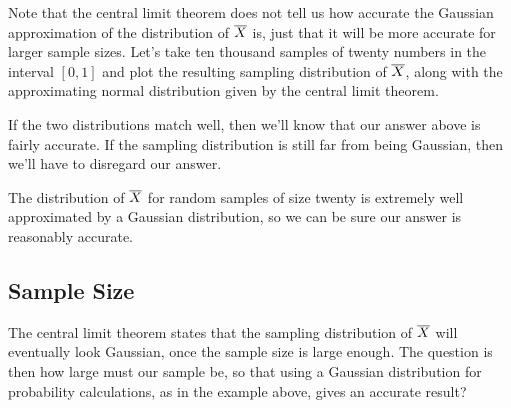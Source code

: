 \begin{example}
Note that the central limit theorem does not tell us how accurate the Gaussian approximation of the distribution of ${\overline{X}}$ is, just that it will be more accurate for larger sample sizes. Let's take ten thousand samples of twenty numbers in the interval $[0,1]$ and plot the resulting sampling distribution of ${\overline{X}}$, along with the approximating normal distribution given by the central limit theorem.

If the two distributions match well, then we'll know that our answer above is fairly accurate. If the sampling distribution is still far from being Gaussian, then we'll have to disregard our answer.
\begin{center}
\end{center}
The distribution of ${\overline{X}}$ for random samples of size twenty is extremely well approximated by a Gaussian distribution, so we can be sure our answer is reasonably accurate.
\end{example}

\subsection*{Sample Size}

The central limit theorem states that the sampling distribution of ${\overline{X}}$ will eventually look Gaussian, once the sample size is large enough. The question is then how large must our sample be, so that using a Gaussian distribution for probability calculations, as in the example above, gives an accurate result?

